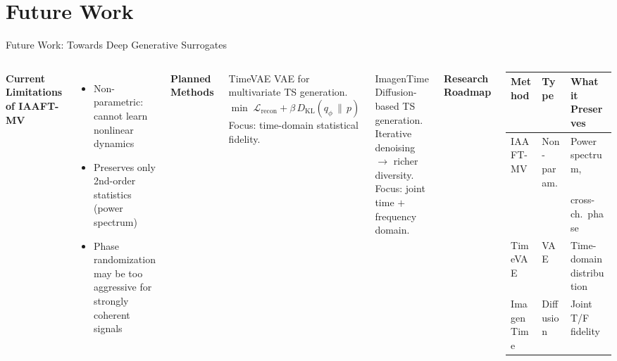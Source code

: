 \documentclass[aspectratio=169,10pt]{beamer}
\begin{document}
\section{Future Work}
\begin{frame}{Future Work: Towards Deep Generative Surrogates}
  \begin{columns}[T]
      \textbf{Current Limitations of IAAFT-MV}
      \begin{itemize}
        \item Non-parametric: cannot learn nonlinear dynamics
        \item Preserves only 2nd-order statistics (power spectrum)
        \item Phase randomization may be too aggressive for strongly
              coherent signals
      \end{itemize}
      \vspace{0.4em}

      \textbf{Planned Methods}
      \begin{block}{TimeVAE}
        \small
        VAE for multivariate TS generation.\\
        $\min\;
         \mathcal{L}_{\mathrm{recon}}
         + \beta\,D_{\mathrm{KL}}(q_\phi\,\|\,p)$\\
        Focus: time-domain statistical fidelity.
      \end{block}
      \vspace{0.3em}
      \begin{block}{ImagenTime}
        \small
        Diffusion-based TS generation.\\
        Iterative denoising $\to$ richer diversity.\\
        Focus: joint time $+$ frequency domain.
      \end{block}

      \textbf{Research Roadmap}
      \vspace{0.3em}

      \begin{tabular}{@{}lll@{}}
        \toprule
        \textbf{Method} & \textbf{Type} & \textbf{What it Preserves} \\
        \midrule
        IAAFT-MV   & Non-param. & Power spectrum, \\
                   &            & cross-ch.\ phase \\
        TimeVAE    & VAE        & Time-domain distribution \\
        ImagenTime & Diffusion  & Joint T/F fidelity \\
        \bottomrule
      \end{tabular}


\end{columns}
\end{frame}
\end{document}
